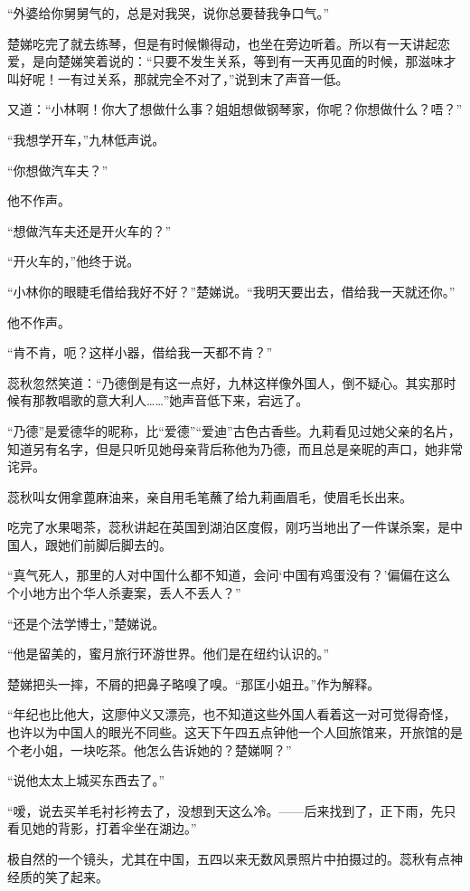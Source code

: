 \par “外婆给你舅舅气的，总是对我哭，说你总要替我争口气。”
\par 楚娣吃完了就去练琴，但是有时候懒得动，也坐在旁边听着。所以有一天讲起恋爱，是向楚娣笑着说的：“只要不发生关系，等到有一天再见面的时候，那滋味才叫好呢！一有过关系，那就完全不对了，”说到末了声音一低。
\par 又道：“小林啊！你大了想做什么事？姐姐想做钢琴家，你呢？你想做什么？唔？”
\par “我想学开车，”九林低声说。
\par “你想做汽车夫？”
\par 他不作声。
\par “想做汽车夫还是开火车的？”
\par “开火车的，”他终于说。
\par “小林你的眼睫毛借给我好不好？”楚娣说。“我明天要出去，借给我一天就还你。”
\par 他不作声。
\par “肯不肯，呃？这样小器，借给我一天都不肯？”
\par 蕊秋忽然笑道：“乃德倒是有这一点好，九林这样像外国人，倒不疑心。其实那时候有那教唱歌的意大利人……”她声音低下来，宕远了。
\par “乃德”是爱德华的昵称，比“爱德”“爱迪”古色古香些。九莉看见过她父亲的名片，知道另有名字，但是只听见她母亲背后称他为乃德，而且总是亲昵的声口，她非常诧异。
\par 蕊秋叫女佣拿蓖麻油来，亲自用毛笔蘸了给九莉画眉毛，使眉毛长出来。
\par 吃完了水果喝茶，蕊秋讲起在英国到湖泊区度假，刚巧当地出了一件谋杀案，是中国人，跟她们前脚后脚去的。
\par “真气死人，那里的人对中国什么都不知道，会问‘中国有鸡蛋没有？’偏偏在这么个小地方出个华人杀妻案，丢人不丢人？”
\par “还是个法学博士，”楚娣说。
\par “他是留美的，蜜月旅行环游世界。他们是在纽约认识的。”
\par 楚娣把头一摔，不屑的把鼻子略嗅了嗅。“那匡小姐丑。”作为解释。
\par “年纪也比他大，这廖仲义又漂亮，也不知道这些外国人看着这一对可觉得奇怪，也许以为中国人的眼光不同些。这天下午四五点钟他一个人回旅馆来，开旅馆的是个老小姐，一块吃茶。他怎么告诉她的？楚娣啊？”
\par “说他太太上城买东西去了。”
\par “嗳，说去买羊毛衬衫袴去了，没想到天这么冷。——后来找到了，正下雨，先只看见她的背影，打着伞坐在湖边。”
\par 极自然的一个镜头，尤其在中国，五四以来无数风景照片中拍摄过的。蕊秋有点神经质的笑了起来。
